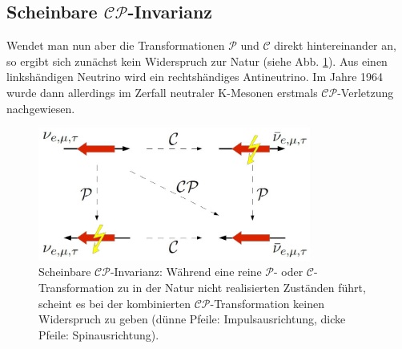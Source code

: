 \subsection{Scheinbare $\mathcal{CP}$-Invarianz}
Wendet man nun aber die Transformationen $\mathcal{P}$ und $\mathcal{C}$ direkt hintereinander an, so ergibt sich zunächst kein Widerspruch zur Natur (siehe Abb. \ref{fig:cp_invarianz}). Aus einen linkshändigen Neutrino wird ein rechtshändiges Antineutrino. Im Jahre 1964 wurde dann allerdings im Zerfall neutraler K-Mesonen erstmals $\mathcal{CP}$-Verletzung nachgewiesen. \cite{kleinknecht}

\begin{figure}[hptb]
\centering
\includegraphics[width = 0.8\textwidth]{cp_invarianz}
\caption{Scheinbare $\mathcal{CP}$-Invarianz: Während eine reine $\mathcal{P}$- oder $\mathcal{C}$-Transformation zu in der Natur nicht realisierten Zuständen führt, scheint es bei der kombinierten $\mathcal{CP}$-Transformation keinen Widerspruch zu geben (dünne Pfeile: Impulsausrichtung, dicke Pfeile: Spinausrichtung).}
\label{fig:cp_invarianz}
\end{figure}




